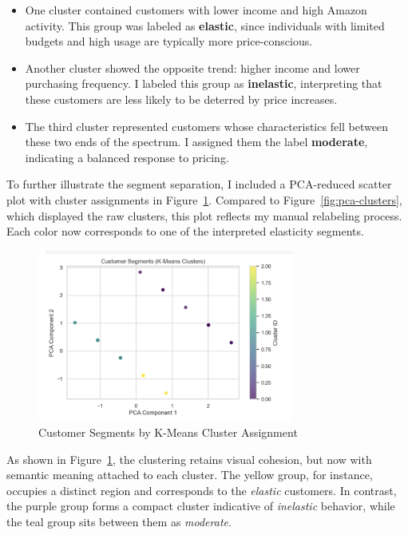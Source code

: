 \documentclass[12pt]{article}
\begin{document}
\begin{itemize}
    \item One cluster contained customers with lower income and high Amazon activity. This group was labeled as \textbf{elastic}, since individuals with limited budgets and high usage are typically more price-conscious.
    \item Another cluster showed the opposite trend: higher income and lower purchasing frequency. I labeled this group as \textbf{inelastic}, interpreting that these customers are less likely to be deterred by price increases.
    \item The third cluster represented customers whose characteristics fell between these two ends of the spectrum. I assigned them the label \textbf{moderate}, indicating a balanced response to pricing.
\end{itemize}

To further illustrate the segment separation, I included a PCA-reduced scatter plot with cluster assignments in Figure~\ref{fig:cluster-assignment}. Compared to Figure~\ref{fig:pca-clusters}, which displayed the raw clusters, this plot reflects my manual relabeling process. Each color now corresponds to one of the interpreted elasticity segments.

\begin{figure}[h!]
  \centering
  \includegraphics[width=0.75\textwidth]{customer segments (kmeans clusters).png}
  \caption{Customer Segments by K-Means Cluster Assignment}
  \label{fig:cluster-assignment}
\end{figure}

As shown in Figure~\ref{fig:cluster-assignment}, the clustering retains visual cohesion, but now with semantic meaning attached to each cluster. The yellow group, for instance, occupies a distinct region and corresponds to the \textit{elastic} customers. In contrast, the purple group forms a compact cluster indicative of \textit{inelastic} behavior, while the teal group sits between them as \textit{moderate}.
\end{document}
